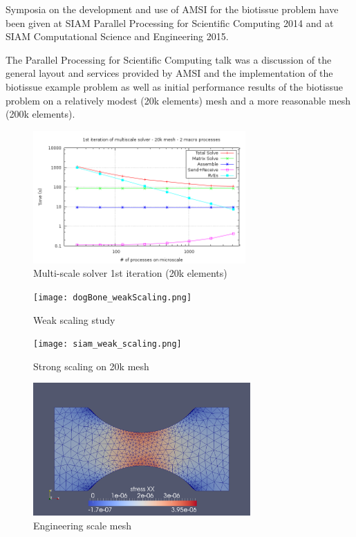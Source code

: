 Symposia on the development and use of AMSI for the biotissue problem have been given at SIAM Parallel Processing for Scientific Computing 2014 and at SIAM Computational Science and Engineering 2015.

The Parallel Processing for Scientific Computing talk \cite{} was a discussion of the general layout and services provided by AMSI and the implementation of the biotissue example problem as well as initial performance results of the biotissue problem on a relatively modest (20k elements) mesh and a more reasonable mesh (200k elements).

\begin{figure}
  \begin{center}
    \includegraphics[height=2in]{allTimes_2macro_20k.png}
  \end{center}
  \caption{\small Multi-scale solver 1st iteration (20k elements)}
  \label{20k_first_iteration}
\end{figure}

\begin{figure}
  \begin{center}
    \texttt{[image: dogBone\_weakScaling.png]}
  \end{center}
  \caption{\small Weak scaling study}
  \label{weak_scaling}
\end{figure}

\begin{figure}
  \begin{center}
    \texttt{[image: siam\_weak\_scaling.png]}
  \end{center}
  \caption{\small Strong scaling on 20k mesh}
  \label{strong_scaling}
\end{figure}

\begin{figure}
  \begin{center}
    \includegraphics[height=2in]{dogBone14k.png}
  \end{center}
  \caption{\small Engineering scale mesh}
  \label{dogbone_mesh}
\end{figure}

